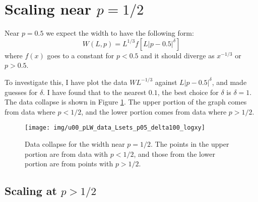 \documentclass[a4paper,10pt]{article}
\newcommand{\fref}[1]{Figure \ref{#1}}
\begin{document}
\section{Scaling near $p=1/2$}

Near $p=0.5$ we expect the width to have the following form:
\begin{equation}
  W(L,p)= L^{1/3} f[L|p-0.5|^\delta]
\end{equation}
where $f(x)$ goes to a constant for $p<0.5$ and it should diverge as $x^{-1/3}$ or $p>0.5$.

To investigate this, I have plot the data $WL^{-1/3}$ against $L|p-0.5|^\delta$, and made guesses for $\delta$. I have found that to the nearest $0.1$, the best choice for $\delta$ is $\delta = 1$. The data collapse is shown in \fref{fig:p05_delta1_scaling}. The upper portion of the graph comes from data where $p < 1/2$, and the lower portion comes from data where $p > 1/2$. 
\begin{figure}
 \centering
 \texttt{[image: img/u00\_pLW\_data\_Lsets\_p05\_delta100\_logxy]}
 \caption{Data collapse for the width near $p = 1/2$. The points in the upper portion are from data with $p<1/2$, and those from the lower portion are from points with $p > 1/2$.}
 \label{fig:p05_delta1_scaling}
\end{figure}

\subsection{Scaling at $p > 1/2$}
\end{document}
